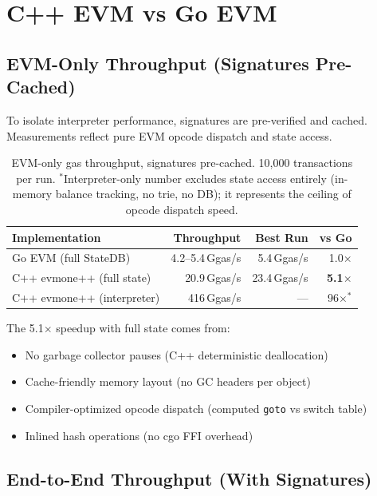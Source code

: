 \section{C++ EVM vs Go EVM}


\subsection{EVM-Only Throughput (Signatures Pre-Cached)}

To isolate interpreter performance, signatures are pre-verified and cached. Measurements
reflect pure EVM opcode dispatch and state access.

\begin{table}[h]
\centering
\small
\begin{tabular}{lrrr}
\toprule
\textbf{Implementation} & \textbf{Throughput} & \textbf{Best Run} & \textbf{vs Go} \\
\midrule
Go EVM (full StateDB)       & 4.2--5.4\,Ggas/s & 5.4\,Ggas/s  & 1.0$\times$ \\
C++ evmone++ (full state)   & 20.9\,Ggas/s     & 23.4\,Ggas/s & \textbf{5.1$\times$} \\
C++ evmone++ (interpreter)  & 416\,Ggas/s      & ---           & 96$\times$$^*$ \\
\bottomrule
\end{tabular}
\caption{EVM-only gas throughput, signatures pre-cached. 10{,}000 transactions per run.
$^*$Interpreter-only number excludes state access entirely (in-memory balance tracking,
no trie, no DB); it represents the ceiling of opcode dispatch speed.}
\label{tab:cpp_vs_go}
\end{table}

The 5.1$\times$ speedup with full state comes from:
\begin{itemize}
\item No garbage collector pauses (C++ deterministic deallocation)
\item Cache-friendly memory layout (no GC headers per object)
\item Compiler-optimized opcode dispatch (computed \texttt{goto} vs switch table)
\item Inlined hash operations (no cgo FFI overhead)
\end{itemize}

\subsection{End-to-End Throughput (With Signatures)}

